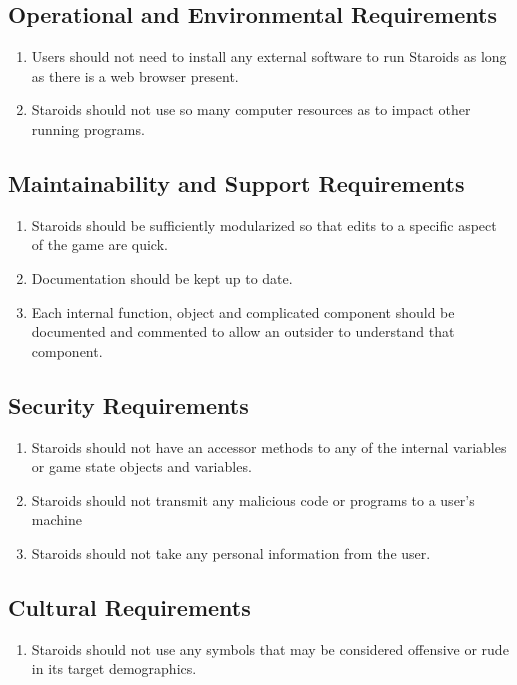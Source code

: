 \documentclass[12pt, titlepage]{article}
\begin{document}
\subsection{Operational and Environmental Requirements}
  \begin{enumerate}
    \item Users should not need to install any external software to run Staroids as long as there is a web browser present.
    \item Staroids should not use so many computer resources as to impact other running programs.
  \end{enumerate}

\subsection{Maintainability and Support Requirements}
  \begin{enumerate}
    \item Staroids should be sufficiently modularized so that edits to a specific aspect of the game are quick.
    \item Documentation should be kept up to date.
    \item Each internal function, object and complicated component should be documented and commented to allow an outsider to understand that component.
  \end{enumerate}

\subsection{Security Requirements}
  \begin{enumerate}
    \item Staroids should not have an accessor methods to any of the internal variables or game state objects and variables.
    \item Staroids should not transmit any malicious code or programs to a user's machine
    \item Staroids should not take any personal information from the user.
  \end{enumerate}

\subsection{Cultural Requirements}
  \begin{enumerate}
    \item Staroids should not use any symbols that may be considered offensive or rude in its target demographics.
  \end{enumerate}
\end{document}
